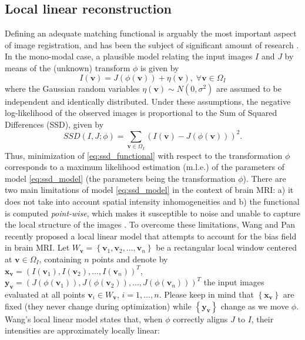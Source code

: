 \subsection{Local linear reconstruction}
Defining an adequate matching functional is arguably the most important aspect of image registration, and has been the subject of significant amount of research \cite{Sotiras2013}. In the mono-modal case, a plausible model relating the input images $I$ and $J$ by means of the (unknown) transform $\phi$ is given by
\begin{equation}\label{eq:ssd_model}
    I(\mathbf{v}) = J(\phi(\mathbf{v})) + \eta(\mathbf{v}), \; \forall \mathbf{v} \in\Omega_{I}
\end{equation}
where the Gaussian random variables $\eta(\mathbf{v}) \sim N(0, \sigma^{2})$ are assumed to be independent and identically distributed. Under these assumptions, the negative log-likelihood of the observed images is proportional to the Sum of Squared Differences (SSD), given by
\begin{equation}\label{eq:ssd_functional}
    SSD(I, J; \phi) = \sum_{\mathbf{v} \in \Omega_{I}} \left(I(\mathbf{v}) - J(\phi(\mathbf{v}))\right)^{2}.
\end{equation}
Thus, minimization of \eqref{eq:ssd_functional} with respect to the transformation $\phi$ corresponds to a maximum likelihood estimation (m.l.e.) of the parameters of model \eqref{eq:ssd_model} (the parameters being the transformation $\phi$). There are two main limitations of model \eqref{eq:ssd_model} in the context of brain MRI: a) it does not take into account spatial intensity inhomogeneities and b) the functional is computed \emph{point-wise}, which makes it susceptible to noise and unable to capture the local structure of the images \cite{Heinrich2012}. To overcome these limitations, Wang and Pan \cite{Wang2014} recently proposed a local linear model that attempts to account for the bias field in brain MRI. Let $W_{\mathbf{v}} = \left\lbrace \mathbf{v}_{1}, \mathbf{v}_{2}, ..., \mathbf{v}_{n} \right\rbrace$ be a rectangular local window centered at $\mathbf{v} \in\Omega_{I}$, containing $n$ points and denote by $\mathbf{x}_{\mathbf{v}} = (I(\mathbf{v}_{1}), I(\mathbf{v}_{2}), ..., I(\mathbf{v}_{n}))^{T}$, $\mathbf{y}_{\mathbf{v}} = (J(\phi(\mathbf{v}_{1})), J(\phi(\mathbf{v}_{2})), ..., J(\phi(\mathbf{v}_{n})))^{T}$ the input images evaluated at all points $\mathbf{v}_{i}\in W_{\mathbf{v}}$, $i=1, ..., n$. Please keep in mind that $\left\lbrace\mathbf{x}_{\mathbf{v}}\right\rbrace$ are fixed (they never change during optimization) while $\left\lbrace\mathbf{y}_{\mathbf{v}}\right\rbrace$ change as we move $\phi$. Wang's local linear model states that, when $\phi$ correctly aligns $J$ to $I$, their intensities are approximately locally linear:
